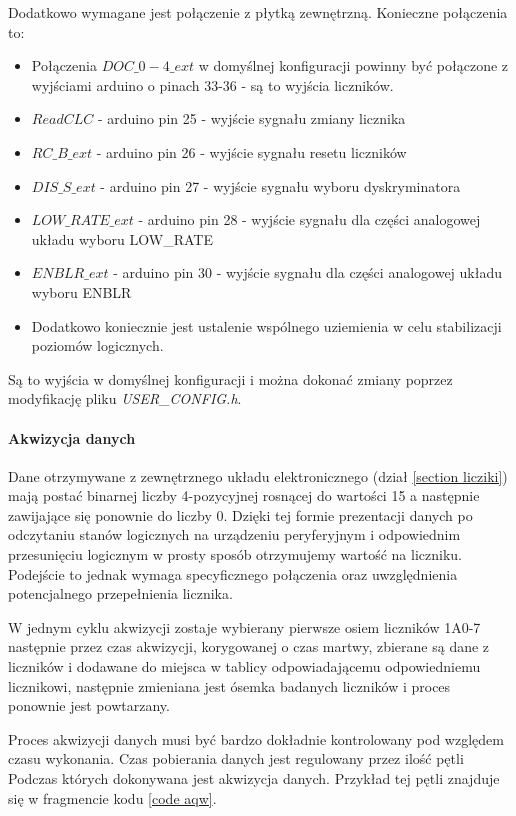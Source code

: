 Dodatkowo wymagane jest połączenie z płytką zewnętrzną. Konieczne połączenia to:
\begin{itemize}
        \item Połączenia $DOC\_0-4\_ext$ w domyślnej konfiguracji powinny być połączone z wyjściami arduino o pinach 33-36 - są to wyjścia liczników.
        \item $ReadCLC$ - arduino pin 25 - wyjście sygnału zmiany licznika
        \item $RC\_B\_ext$ - arduino pin 26 - wyjście sygnału resetu liczników 
        \item $DIS\_S\_ext$ - arduino pin 27 - wyjście sygnału wyboru dyskryminatora
        \item $LOW\_RATE\_ext$ - arduino pin 28 - wyjście sygnału dla części analogowej układu wyboru LOW\_RATE
        \item $ENBLR\_ext$ - arduino pin 30 - wyjście sygnału dla części analogowej układu wyboru ENBLR 
        \item Dodatkowo koniecznie jest ustalenie wspólnego uziemienia w celu stabilizacji poziomów logicznych.
\end{itemize}

Są to wyjścia w domyślnej konfiguracji i można dokonać zmiany poprzez modyfikację pliku \textit{USER\_CONFIG.h}.



\paragraph{Akwizycja danych}
Dane otrzymywane z zewnętrznego układu elektronicznego (dział \ref{section licziki}) mają postać binarnej liczby 4-pozycyjnej rosnącej do wartości 15 a następnie zawijające się ponownie do liczby 0. 
Dzięki tej formie prezentacji danych po odczytaniu stanów logicznych na urządzeniu peryferyjnym i odpowiednim przesunięciu logicznym w prosty sposób otrzymujemy wartość na liczniku. 
Podejście to jednak wymaga specyficznego połączenia oraz uwzględnienia potencjalnego przepełnienia licznika. 

W jednym cyklu akwizycji zostaje wybierany pierwsze osiem liczników 1A0-7 następnie przez czas akwizycji, korygowanej o czas martwy, zbierane są dane z liczników i dodawane do miejsca w tablicy odpowiadającemu odpowiedniemu licznikowi, następnie zmieniana jest ósemka badanych liczników i proces ponownie jest powtarzany. 

Proces akwizycji danych musi być bardzo dokładnie kontrolowany pod względem czasu wykonania.
Czas pobierania danych jest regulowany przez ilość pętli Podczas których dokonywana jest akwizycja danych. 
Przykład tej pętli znajduje się w fragmencie kodu \ref{code aqw}.

